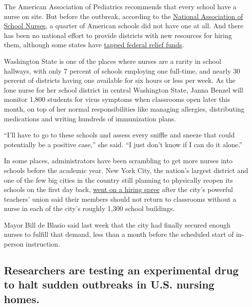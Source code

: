 The American Association of Pediatrics recommends that every school have
a nurse on site. But before the outbreak, according to the
\href{https://higherlogicdownload.s3.amazonaws.com/NASN/3870c72d-fff9-4ed7-833f-215de278d256/UploadedImages/PDFs/Advocacy/2017_Workforce_Study_Infographic_School_Nurses_in_the_Nation.pdf}{National
Association of School Nurses}, a quarter of American schools did not
have one at all. And there has been no national effort to provide
districts with new resources for hiring them, although some states have
\href{http://pulse.ncpolicywatch.org/2020/08/12/federal-funds-set-to-pay-for-more-school-nurses-counselors-social-workers-and-psychologists/}{tapped
federal relief funds}.

Washington State is one of the places where nurses are a rarity in
school hallways, with only 7 percent of schools employing one full-time,
and nearly 30 percent of districts having one available for six hours or
less per week. As the lone nurse for her school district in central
Washington State, Janna Benzel will monitor 1,800 students for virus
symptoms when classrooms open later this month, on top of her normal
responsibilities like managing allergies, distributing medications and
writing hundreds of immunization plans.

``I'll have to go to these schools and assess every sniffle and sneeze
that could potentially be a positive case,'' she said. ``I just don't
know if I can do it alone.''

In some places, administrators have been scrambling to get more nurses
into schools before the academic year. New York City, the nation's
largest district and one of the few big cities in the country still
planning to physically reopen its schools on the first day back,
\href{https://www.nytimes3xbfgragh.onion/2020/08/05/nyregion/nyc-schools-reopening.html}{went
on a hiring spree} after the city's powerful teachers' union said their
members should not return to classrooms without a nurse in each of the
city's roughly 1,300 school buildings.

Mayor Bill de Blasio said last week that the city had finally secured
enough nurses to fulfill that demand, less than a month before the
scheduled start of in-person instruction.

\hypertarget{researchers-are-testing-an-experimental-drug-to-halt-sudden-outbreaks-in-us-nursing-homes}{%
\subsection{Researchers are testing an experimental drug to halt sudden
outbreaks in U.S. nursing
homes.}\label{researchers-are-testing-an-experimental-drug-to-halt-sudden-outbreaks-in-us-nursing-homes}}

